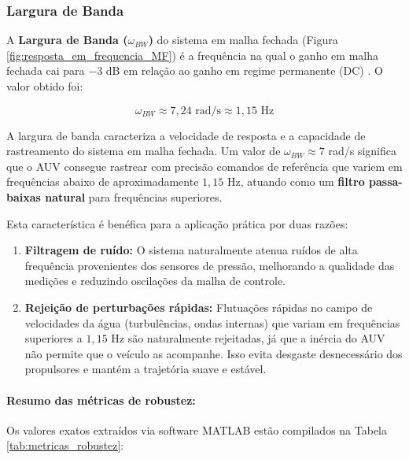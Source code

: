 \documentclass[12pt, a4paper]{article}
\begin{document}
				\subsubsection{Largura de Banda}

					A \textbf{Largura de Banda ($\omega_{BW}$)} do sistema em malha fechada (Figura \ref{fig:resposta_em_frequencia_MF}) é a frequência na qual o ganho em malha fechada cai para $-3$ dB em relação ao ganho em regime permanente (DC) \cite{ogata}. O valor obtido foi:

					\begin{equation}
						\omega_{BW} \approx 7{,}24 \text{ rad/s} \approx 1{,}15 \text{ Hz}
					\end{equation}

					A largura de banda caracteriza a velocidade de resposta e a capacidade de rastreamento do sistema em malha fechada. Um valor de $\omega_{BW} \approx 7$ rad/s significa que o AUV consegue rastrear com precisão comandos de referência que variem em frequências abaixo de aproximadamente $1{,}15$ Hz, atuando como um \textbf{filtro passa-baixas natural} para frequências superiores.

					Esta característica é benéfica para a aplicação prática por duas razões:

					\begin{enumerate}
						\item \textbf{Filtragem de ruído:} O sistema naturalmente atenua ruídos de alta frequência provenientes dos sensores de pressão, melhorando a qualidade das medições e reduzindo oscilações da malha de controle.
						
						\item \textbf{Rejeição de perturbações rápidas:} Flutuações rápidas no campo de velocidades da água (turbulências, ondas internas) que variam em frequências superiores a $1{,}15$ Hz são naturalmente rejeitadas, já que a inércia do AUV não permite que o veículo as acompanhe. Isso evita desgaste desnecessário dos propulsores e mantém a trajetória suave e estável.
					\end{enumerate}

					\paragraph{Resumo das métricas de robustez:}

						Os valores exatos extraídos via software MATLAB estão compilados na Tabela \ref{tab:metricas_robustez}:
\end{document}
